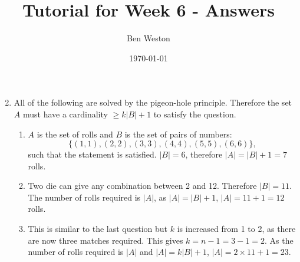 \documentclass{article}
\title{Tutorial for Week 6 - Answers}
\author{Ben Weston}
\date{\today}
\begin{document}
\maketitle
\begin{enumerate}\setcounter{enumi}{1}
        \item All of the following are solved by the pigeon-hole principle. Therefore the set $A$ must have a cardinality $\geq k|B|+1$ to satisfy the question.
                \begin{enumerate}
                        \item $A$ is the set of rolls and $B$ is the set of pairs of numbers: $$\{(1,1),(2,2),(3,3),(4,4),(5,5),(6,6)\},$$ such that the statement is satisfied. $|B|=6$, therefore $|A|=|B|+1=7$ rolls.
                        \item Two die can give any combination between 2 and 12. Therefore $|B|=11$. The number of rolls required is $|A|$, as $|A|=|B|+1$, $|A|=11+1=12$ rolls.
                        \item This is similar to the last question but $k$ is increased from 1 to 2, as there are now three matches required. This gives $k=n-1=3-1=2$. As the number of rolls required is $|A|$ and $|A|=k|B|+1$, $|A|=2\times11+1=23$.
                \end{enumerate}
\end{enumerate}
\end{document}
